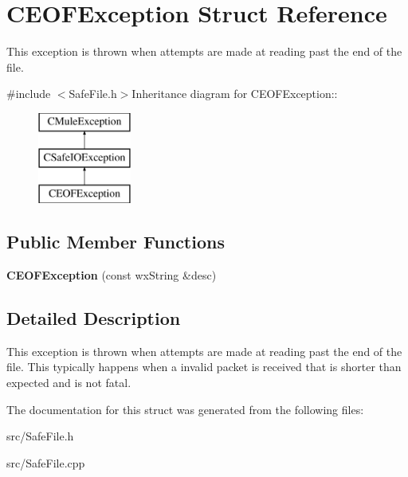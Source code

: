 \section{CEOFException Struct Reference}
\label{structCEOFException}


This exception is thrown when attempts are made at reading past the end of the file.  


{\ttfamily \#include $<$SafeFile.h$>$}Inheritance diagram for CEOFException::\begin{figure}[H]
\begin{center}
\leavevmode
\includegraphics[height=3cm]{structCEOFException}
\end{center}
\end{figure}
\subsection*{Public Member Functions}
\begin{DoxyCompactItemize}
\item 
{\bfseries CEOFException} (const wxString \&desc)\label{structCEOFException_a83e46ef554ffa31597835238e4ed0bfa}

\end{DoxyCompactItemize}


\subsection{Detailed Description}
This exception is thrown when attempts are made at reading past the end of the file. This typically happens when a invalid packet is received that is shorter than expected and is not fatal. 

The documentation for this struct was generated from the following files:\begin{DoxyCompactItemize}
\item 
src/SafeFile.h\item 
src/SafeFile.cpp\end{DoxyCompactItemize}
